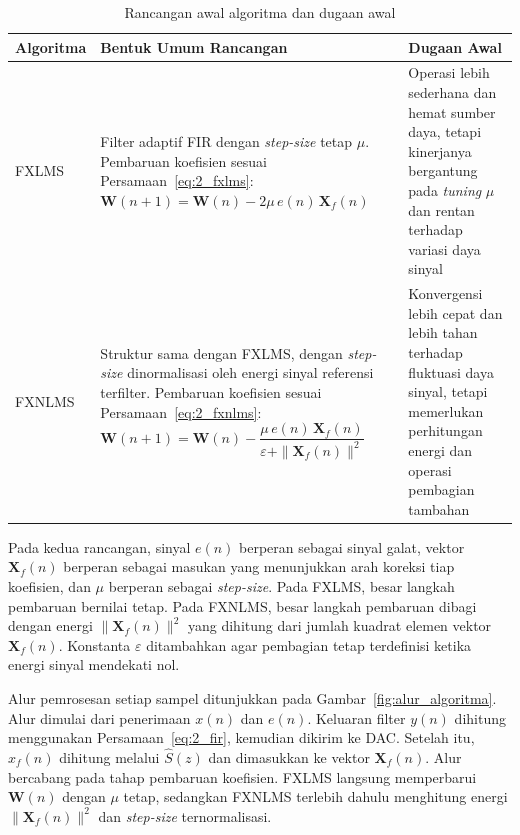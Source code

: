 \begin{table}[H]
  \centering
  \small
  \caption{Rancangan awal algoritma dan dugaan awal}
  \label{tab:rancangan_awal}
  \renewcommand{\arraystretch}{1.4}
  \begin{tabular}{|>{\centering\arraybackslash}p{1.8cm}|>{\raggedright\arraybackslash}p{6.8cm}|>{\raggedright\arraybackslash}p{5.6cm}|}
  \hline
  \textbf{Algoritma} & \textbf{Bentuk Umum Rancangan} & \textbf{Dugaan Awal} \\
  \hline
  FXLMS & Filter adaptif FIR dengan \emph{step-size} tetap $\mu$. Pembaruan koefisien sesuai Persamaan~\eqref{eq:2_fxlms}: $\mathbf{W}(n+1) = \mathbf{W}(n) - 2\mu\,e(n)\,\mathbf{X}_f(n)$ & Operasi lebih sederhana dan hemat sumber daya, tetapi kinerjanya bergantung pada \emph{tuning} $\mu$ dan rentan terhadap variasi daya sinyal \\
  \hline
  FXNLMS & Struktur sama dengan FXLMS, dengan \emph{step-size} dinormalisasi oleh energi sinyal referensi terfilter. Pembaruan koefisien sesuai Persamaan~\eqref{eq:2_fxnlms}: $\mathbf{W}(n+1) = \mathbf{W}(n) - \dfrac{\mu\,e(n)\,\mathbf{X}_f(n)}{\varepsilon + \|\mathbf{X}_f(n)\|^2}$ & Konvergensi lebih cepat dan lebih tahan terhadap fluktuasi daya sinyal, tetapi memerlukan perhitungan energi dan operasi pembagian tambahan \\
  \hline
  \end{tabular}
\end{table}

Pada kedua rancangan, sinyal $e(n)$ berperan sebagai sinyal galat, vektor $\mathbf{X}_f(n)$ berperan sebagai masukan yang menunjukkan arah koreksi tiap koefisien, dan $\mu$ berperan sebagai \emph{step-size}. Pada FXLMS, besar langkah pembaruan bernilai tetap. Pada FXNLMS, besar langkah pembaruan dibagi dengan energi $\|\mathbf{X}_f(n)\|^2$ yang dihitung dari jumlah kuadrat elemen vektor $\mathbf{X}_f(n)$. Konstanta $\varepsilon$ ditambahkan agar pembagian tetap terdefinisi ketika energi sinyal mendekati nol.

Alur pemrosesan setiap sampel ditunjukkan pada Gambar~\ref{fig:alur_algoritma}. Alur dimulai dari penerimaan $x(n)$ dan $e(n)$. Keluaran filter $y(n)$ dihitung menggunakan Persamaan~\eqref{eq:2_fir}, kemudian dikirim ke DAC. Setelah itu, $x_f(n)$ dihitung melalui $\hat{S}(z)$ dan dimasukkan ke vektor $\mathbf{X}_f(n)$. Alur bercabang pada tahap pembaruan koefisien. FXLMS langsung memperbarui $\mathbf{W}(n)$ dengan $\mu$ tetap, sedangkan FXNLMS terlebih dahulu menghitung energi $\|\mathbf{X}_f(n)\|^2$ dan \emph{step-size} ternormalisasi.

